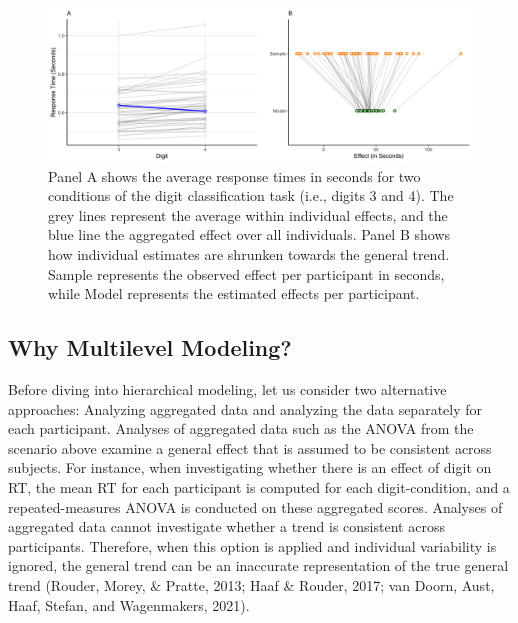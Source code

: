 \documentclass[
  english,
  doc,floatsintext]{apa6}
\begin{document}
\begin{figure}[H]

\includegraphics[width=0.95\linewidth]{I - Images/Fig1_meanrtandhierplot_v2} \hfill{}

\caption{Panel A shows the average response times in seconds for two conditions of the digit classification task (i.e., digits 3 and 4). The grey lines represent the average within individual effects, and the blue line the aggregated effect over all individuals. Panel B shows how individual estimates are shrunken towards the general trend. Sample represents the observed effect per participant in seconds, while Model represents the estimated effects per participant. }\label{fig:figure1}
\end{figure}

\hypertarget{why-multilevel-modeling}{%
\subsection{Why Multilevel Modeling?}\label{why-multilevel-modeling}}

Before diving into hierarchical modeling, let us consider two alternative approaches: Analyzing aggregated data and analyzing the data separately for each participant. Analyses of aggregated data such as the ANOVA from the scenario above examine a general effect that is assumed to be consistent across subjects. For instance, when investigating whether there is an effect of digit on RT, the mean RT for each participant is computed for each digit-condition, and a repeated-measures ANOVA is conducted on these aggregated scores. Analyses of aggregated data cannot investigate whether a trend is consistent across participants. Therefore, when this option is applied and individual variability is ignored, the general trend can be an inaccurate representation of the true general trend (Rouder, Morey, \& Pratte, 2013; Haaf \& Rouder, 2017; van Doorn, Aust, Haaf, Stefan, and Wagenmakers, 2021).
\end{document}

